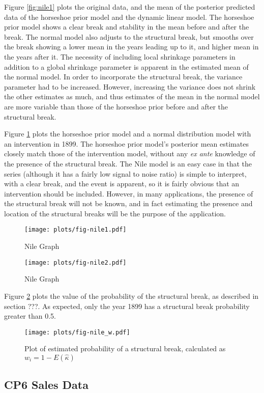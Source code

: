 \documentclass{article}
\begin{document}
Figure \ref{fig:nile1} plots the original data, and the mean of the posterior predicted data of the horseshoe prior model and the dynamic linear model.
The horseshoe prior model shows a clear break and stability in the mean before and after the break.
The normal model also adjusts to the structural break, but smooths over the break showing a lower mean in the years leading up to it, and higher mean in the years after it.
The necessity of including local shrinkage parameters in addition to a global shrinkage parameter is apparent in the estimated mean of the normal model.
In order to incorporate the structural break, the variance parameter had to be increased.
However, increasing the variance does not shrink the other estimates as much, and thus estimates of the mean in the normal model are more variable than those of the horseshoe prior before and after the structural break.

Figure \ref{fig:nile2} plots the horseshoe prior model and a normal distribution model with an intervention in 1899.
The horseshoe prior model's posterior mean estimates closely match those of the intervention model, without any \textit{ex ante} knowledge of the presence of the structural break.
The Nile model is an easy case in that the series (although it has a fairly low signal to  noise ratio) is simple to interpret, with a clear break, and the event is apparent, so it is fairly obvious that an intervention should be included.
However, in many applications, the presence of the structural break will not be known, and in fact estimating the presence and location of the structural breaks will be the purpose of the application.

\begin{figure}[htpb]
  \centering
  \texttt{[image: plots/fig-nile1.pdf]}  
  \caption{Nile Graph}
  \label{fig:nile1}

  \texttt{[image: plots/fig-nile2.pdf]}
  \caption{Nile Graph}
  \label{fig:nile2}
\end{figure}

Figure \ref{fig:nile_w} plots the value of the probability of the structural break, as described in section ???.
As expected, only the year 1899 has a structural break probability greater than 0.5.

\begin{figure}[htpb]
  \centering
  \texttt{[image: plots/fig-nile\_w.pdf]}
  \caption{Plot of estimated probability of a structural break, calculated as $w_{i} = 1 - E(\hat{\kappa})$}
  \label{fig:nile_w}
\end{figure}



\subsection{CP6 Sales Data}
\label{sec:cp6-sales-data}




\printbibliography{}
\end{document}
